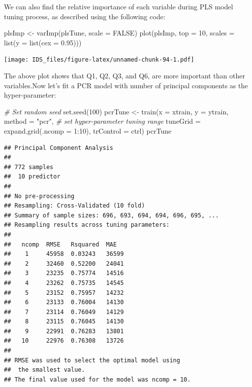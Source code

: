 \documentclass[
  12pt,
]{krantz}
\makeatletter
\newenvironment{Shaded}{\begin{snugshade}}{\end{snugshade}}
\newcommand{\AttributeTok}[1]{\textcolor[rgb]{0.61,0.61,0.61}{#1}}
\newcommand{\CommentTok}[1]{\textcolor[rgb]{0.37,0.37,0.37}{\textit{#1}}}
\newcommand{\ConstantTok}[1]{\textcolor[rgb]{0,0,0}{#1}}
\newcommand{\DecValTok}[1]{\textcolor[rgb]{0.06,0.06,0.06}{#1}}
\newcommand{\FloatTok}[1]{\textcolor[rgb]{0.06,0.06,0.06}{#1}}
\newcommand{\FunctionTok}[1]{\textcolor[rgb]{0,0,0}{#1}}
\newcommand{\NormalTok}[1]{#1}
\newcommand{\OtherTok}[1]{\textcolor[rgb]{0.37,0.37,0.37}{#1}}
\newcommand{\SpecialCharTok}[1]{\textcolor[rgb]{0,0,0}{#1}}
\newcommand{\StringTok}[1]{\textcolor[rgb]{0.5,0.5,0.5}{#1}}
\newenvironment{kframe}{%
\medskip{}
\setlength{\fboxsep}{.8em}
 \def\at@end@of@kframe{}%
 \ifinner\ifhmode%
  \def\at@end@of@kframe{\end{minipage}}%
  \begin{minipage}{\columnwidth}%
 \fi\fi%
 \def\FrameCommand##1{\hskip\@totalleftmargin \hskip-\fboxsep
 \colorbox{shadecolor}{##1}\hskip-\fboxsep
     \hskip-\linewidth \hskip-\@totalleftmargin \hskip\columnwidth}%
 \MakeFramed {\advance\hsize-\width
   \@totalleftmargin\z@ \linewidth\hsize
   \@setminipage}}%
 {\par\unskip\endMakeFramed%
 \at@end@of@kframe}
\renewenvironment{Shaded}{\begin{kframe}}{\end{kframe}}
\makeatother
\begin{document}
We can also find the relative importance of each variable during PLS model tuning process, as described using the following code: 

\begin{Shaded}
\begin{Highlighting}[]
\NormalTok{plsImp }\OtherTok{\textless{}{-}} \FunctionTok{varImp}\NormalTok{(plsTune, }\AttributeTok{scale =} \ConstantTok{FALSE}\NormalTok{)}
\FunctionTok{plot}\NormalTok{(plsImp, }\AttributeTok{top =} \DecValTok{10}\NormalTok{, }\AttributeTok{scales =} \FunctionTok{list}\NormalTok{(}\AttributeTok{y =} \FunctionTok{list}\NormalTok{(}\AttributeTok{cex =} \FloatTok{0.95}\NormalTok{)))}
\end{Highlighting}
\end{Shaded}

\texttt{[image: IDS\_files/figure-latex/unnamed-chunk-94-1.pdf]}

The above plot shows that Q1, Q2, Q3, and Q6, are more important than other variables.Now let's fit a PCR model with number of principal components as the hyper-parameter: 

\begin{Shaded}
\begin{Highlighting}[]
\CommentTok{\# Set random seed}
 \FunctionTok{set.seed}\NormalTok{(}\DecValTok{100}\NormalTok{)}
\NormalTok{ pcrTune }\OtherTok{\textless{}{-}} \FunctionTok{train}\NormalTok{(}\AttributeTok{x =}\NormalTok{ xtrain, }\AttributeTok{y =}\NormalTok{ ytrain,}
          \AttributeTok{method =} \StringTok{"pcr"}\NormalTok{,}
          \CommentTok{\# set hyper{-}parameter tuning range}
          \AttributeTok{tuneGrid =} \FunctionTok{expand.grid}\NormalTok{(}\AttributeTok{.ncomp =} \DecValTok{1}\SpecialCharTok{:}\DecValTok{10}\NormalTok{),}
          \AttributeTok{trControl =}\NormalTok{ ctrl)}
\NormalTok{ pcrTune}
\end{Highlighting}
\end{Shaded}

\begin{verbatim}
## Principal Component Analysis 
## 
## 772 samples
##  10 predictor
## 
## No pre-processing
## Resampling: Cross-Validated (10 fold) 
## Summary of sample sizes: 696, 693, 694, 694, 696, 695, ... 
## Resampling results across tuning parameters:
## 
##   ncomp  RMSE   Rsquared  MAE  
##    1     45958  0.03243   36599
##    2     32460  0.52200   24041
##    3     23235  0.75774   14516
##    4     23262  0.75735   14545
##    5     23152  0.75957   14232
##    6     23133  0.76004   14130
##    7     23114  0.76049   14129
##    8     23115  0.76045   14130
##    9     22991  0.76283   13801
##   10     22976  0.76308   13726
## 
## RMSE was used to select the optimal model using
##  the smallest value.
## The final value used for the model was ncomp = 10.
\end{verbatim}
\end{document}
